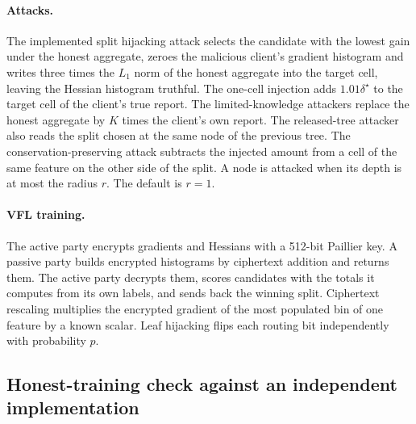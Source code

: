 \documentclass[11pt]{article}
\newcommand{\rev}[1]{{\color{blue}#1}}
\begin{document}
\rev{\paragraph{Attacks.} The implemented split hijacking attack selects the candidate with the lowest gain under the honest aggregate, zeroes the malicious client's gradient histogram and writes three times the $L_1$ norm of the honest aggregate into the target cell, leaving the Hessian histogram truthful. The one-cell injection adds $1.01\delta^\star$ to the target cell of the client's true report. The limited-knowledge attackers replace the honest aggregate by $K$ times the client's own report. The released-tree attacker also reads the split chosen at the same node of the previous tree. The conservation-preserving attack subtracts the injected amount from a cell of the same feature on the other side of the split. A node is attacked when its depth is at most the radius $r$. The default is $r=1$.}

\rev{\paragraph{VFL training.} The active party encrypts gradients and Hessians with a 512-bit Paillier key. A passive party builds encrypted histograms by ciphertext addition and returns them. The active party decrypts them, scores candidates with the totals it computes from its own labels, and sends back the winning split. Ciphertext rescaling multiplies the encrypted gradient of the most populated bin of one feature by a known scalar. Leaf hijacking flips each routing bit independently with probability $p$.}

\subsection{\rev{Honest-training check against an independent implementation}}
\label{sec:xgbcheck}
\end{document}
